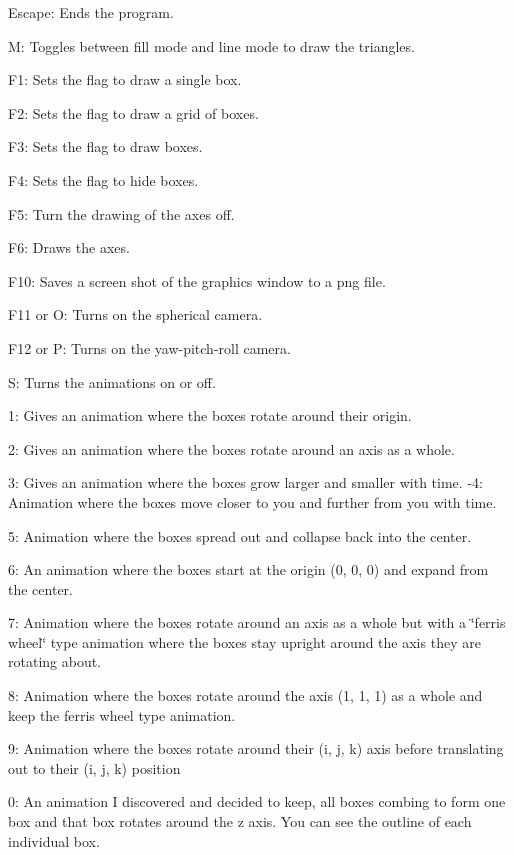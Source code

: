 \begin{DoxyItemize}
\item Escape\+: Ends the program.
\item M\+: Toggles between fill mode and line mode to draw the triangles.
\item F1\+: Sets the flag to draw a single box.
\item F2\+: Sets the flag to draw a grid of boxes.
\item F3\+: Sets the flag to draw boxes.
\item F4\+: Sets the flag to hide boxes.
\item F5\+: Turn the drawing of the axes off.
\item F6\+: Draws the axes.
\item F10\+: Saves a screen shot of the graphics window to a png file.
\item F11 or O\+: Turns on the spherical camera.
\item F12 or P\+: Turns on the yaw-\/pitch-\/roll camera.
\item S\+: Turns the animations on or off.
\item 1\+: Gives an animation where the boxes rotate around their origin.
\item 2\+: Gives an animation where the boxes rotate around an axis as a whole.
\item 3\+: Gives an animation where the boxes grow larger and smaller with time. -\/4\+: Animation where the boxes move closer to you and further from you with time.
\item 5\+: Animation where the boxes spread out and collapse back into the center.
\item 6\+: An animation where the boxes start at the origin (0, 0, 0) and expand from the center.
\item 7\+: Animation where the boxes rotate around an axis as a whole but with a \char`\"{}ferris wheel\char`\"{} type animation where the boxes stay upright around the axis they are rotating about.
\item 8\+: Animation where the boxes rotate around the axis (1, 1, 1) as a whole and keep the ferris wheel type animation.
\item 9\+: Animation where the boxes rotate around their (i, j, k) axis before translating out to their (i, j, k) position
\item 0\+: An animation I discovered and decided to keep, all boxes combing to form one box and that box rotates around the z axis. You can see the outline of each individual box.
\end{DoxyItemize}

